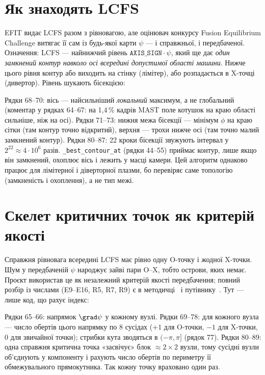 \section{Як знаходять LCFS}\label{sec:geo5-lcfs}

EFIT видає LCFS разом з рівновагою, але оцінювач конкурсу Fusion Equilibrium Challenge витягає її сам із будь-якої карти $\psi$ --- і справжньої, і передбаченої. Означення: LCFS --- найнижчий рівень $\texttt{AXIS\_SIGN}\cdot\psi$, який ще дає \emph{один замкнений контур навколо осі всередині допустимої області машини}. Нижче цього рівня контур або виходить на стінку (лімітер), або розпадається в X-точці (дивертор). Рівень шукають бісекцією:


\noindent Рядки 68--70: вісь --- найсильніший \emph{локальний} максимум, а не глобальний (коментар у рядках 64--67: на 1,4\,\% кадрів MAST поле котушок на краю області сильніше, ніж на осі). Рядки 71--73: нижня межа бісекції --- мінімум $\phi$ на краю сітки (там контур точно відкритий), верхня --- трохи нижче осі (там точно малий замкнений контур). Рядки 80--87: 22 кроки бісекції звужують інтервал у $2^{22}\approx4\cdot10^6$ разів. \texttt{\_best\_contour\_at} (рядки 44--55) приймає контур, лише якщо він замкнений, охоплює вісь і лежить у масці камери. Цей алгоритм однаково працює для лімітерної і діверторної плазми, бо перевіряє саме топологію (замкненість і охоплення), а не тип межі.

\section{Скелет критичних точок як критерій якості}\label{sec:geo5-skeleton}

Справжня рівновага всередині LCFS має рівно одну O-точку і жодної X-точки. Шум у передбаченій $\psi$ народжує зайві пари O--X, тобто острови, яких немає. Проєкт використав це як незалежний критерій якості передбачення; повний розбір із числами (E9--E16, R5, R7, R9) є в методичці~\cite[розд.~4, п.~4.4]{Manual} і путівнику~\cite{Guide}. Тут --- лише код, що рахує індекс:


\noindent Рядки 65--66: напрямок $\grad\psi$ у кожному вузлі. Рядки 69--78: для кожного вузла --- число обертів цього напрямку по 8 сусідах ($+1$ для O-точки, $-1$ для X-точки, 0 для звичайної точки); стрибки кута зводяться в $(-\pi,\pi]$ (рядок 77). Рядки 80--89: одна справжня критична точка «засвічує» блок $\approx2\times2$ вузли, тому сусідні вузли об'єднують у компоненту і рахують число обертів по периметру її обмежувального прямокутника. Так кожну точку враховано один раз.

